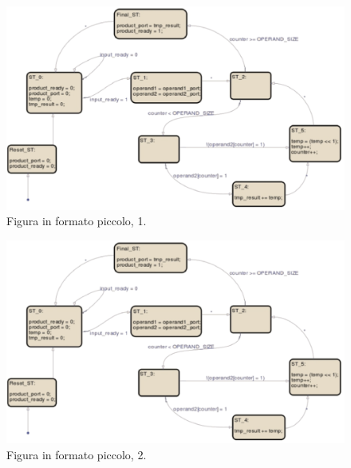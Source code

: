 \documentclass[]{IEEEtran}
\begin{document}
\begin{figure}[bt]
	\centering
	\includegraphics[width=\columnwidth]{figures/EFSM}
	\caption{Figura in formato piccolo, 1.}
	\label{fig:piccola1}
\end{figure}

\begin{figure}[bt]
	\centering
	\includegraphics[width=\columnwidth]{figures/EFSM}
	\caption{Figura in formato piccolo, 2.}
	\label{fig:piccola2}
\end{figure}
\end{document}
